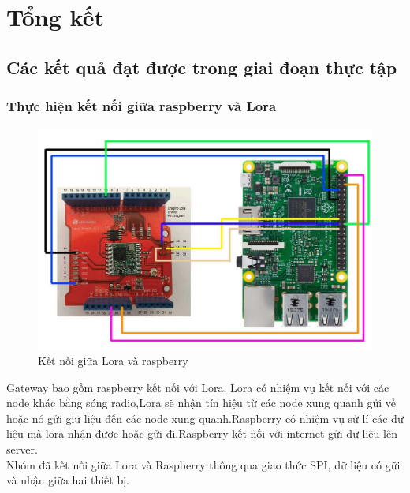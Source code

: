 \chapter{Tổng kết}
\section{Các kết quả đạt được trong giai đoạn thực tập}
\subsection{Thực hiện kết nối giữa raspberry và Lora}
\begin{center}
    \begin{figure}[htp]
    \begin{center}
     \includegraphics[scale=.2]{image6/loraras.jpg}
    \end{center}
    \caption{Kết nối giữa Lora và raspberry}
    \label{refhinh1}
    \end{figure}
\end{center}
Gateway bao gồm raspberry kết nối với Lora. Lora có nhiệm vụ kết nối với các node khác bằng sóng radio,Lora sẽ nhận tín hiệu từ các node xung quanh gửi về hoặc nó gửi giữ liệu đến các node xung quanh.Raspberry có nhiệm vụ sử lí các dữ liệu mà lora nhận được hoặc gửi đi.Raspberry kết nối với internet gửi dữ liệu lên server.\\
Nhóm đã kết nối giữa Lora và Raspberry thông qua giao thức SPI, dữ liệu có gữi và nhận giữa hai thiết bị.
\newpage

